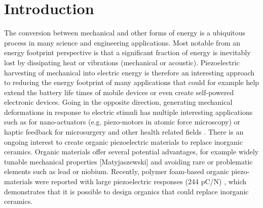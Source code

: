 \section{Introduction}

The conversion between mechanical and other forms of energy is a ubiquitous process in many science and engineering applications.
Most notable from an energy footprint perspective is that a significant fraction of energy is inevitably lost by dissipating heat or vibrations (mechanical or acoustic).
Piezoelectric harvesting of mechanical into electric energy is therefore an interesting approach to reducing the energy
footprint of many applications that could for example help extend the battery life times of mobile devices or even
create self-powered electronic devices. 
Going in the opposite direction, generating mechanical deformations in response to electric stimuli
has multiple interesting applications such as for nano-actuators (e.g. piezo-motors in atomic force microscopy) or haptic feedback for microsurgery and other health related fields \cite{Dagdeviren2014}.
There is an ongoing interest to create organic piezoelectric materials to replace inorganic ceramics\cite{Werling0,Werling1, quan,Moody}.  
Organic materials offer several potential advantages, for example widely tunable mechanical properties [Matyjaszewski] and avoiding rare or
problematic elements such as lead or niobium.
Recently, polymer foam-based organic piezo-materials were reported with large piezoelectric responses (244 pC/N) \cite{Moody}, 
which demonstrates that it is possible to design organics that could replace inorganic ceramics. 

